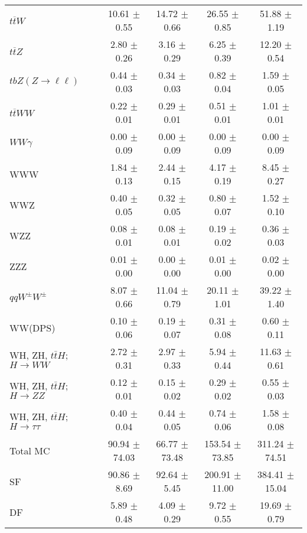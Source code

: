 \begin{tabular}{l|cccc}
                   $t\overline{t}W$ & 10.61 $\pm$  0.55 & 14.72 $\pm$  0.66 & 26.55 $\pm$  0.85 & 51.88 $\pm$  1.19 \\
                   $t\overline{t}Z$ &  2.80 $\pm$  0.26 &  3.16 $\pm$  0.29 &  6.25 $\pm$  0.39 & 12.20 $\pm$  0.54 \\
    $tbZ (Z \rightarrow \ell \ell)$ &  0.44 $\pm$  0.03 &  0.34 $\pm$  0.03 &  0.82 $\pm$  0.04 &  1.59 $\pm$  0.05 \\
                  $t\overline{t}WW$ &  0.22 $\pm$  0.01 &  0.29 $\pm$  0.01 &  0.51 $\pm$  0.01 &  1.01 $\pm$  0.01 \\
                         $WW\gamma$ &  0.00 $\pm$  0.09 &  0.00 $\pm$  0.09 &  0.00 $\pm$  0.09 &  0.00 $\pm$  0.09 \\
                                WWW &  1.84 $\pm$  0.13 &  2.44 $\pm$  0.15 &  4.17 $\pm$  0.19 &  8.45 $\pm$  0.27 \\
                                WWZ &  0.40 $\pm$  0.05 &  0.32 $\pm$  0.05 &  0.80 $\pm$  0.07 &  1.52 $\pm$  0.10 \\
                                WZZ &  0.08 $\pm$  0.01 &  0.08 $\pm$  0.01 &  0.19 $\pm$  0.02 &  0.36 $\pm$  0.03 \\
                                ZZZ &  0.01 $\pm$  0.00 &  0.00 $\pm$  0.00 &  0.01 $\pm$  0.00 &  0.02 $\pm$  0.00 \\
                 $qqW^{\pm}W^{\pm}$ &  8.07 $\pm$  0.66 & 11.04 $\pm$  0.79 & 20.11 $\pm$  1.01 & 39.22 $\pm$  1.40 \\
                            WW(DPS) &  0.10 $\pm$  0.06 &  0.19 $\pm$  0.07 &  0.31 $\pm$  0.08 &  0.60 $\pm$  0.11 \\
WH, ZH, $t\bar{t}H$; $H \rightarrow WW$ &  2.72 $\pm$  0.31 &  2.97 $\pm$  0.33 &  5.94 $\pm$  0.44 & 11.63 $\pm$  0.61 \\
WH, ZH, $t\bar{t}H$; $H \rightarrow ZZ$ &  0.12 $\pm$  0.01 &  0.15 $\pm$  0.02 &  0.29 $\pm$  0.02 &  0.55 $\pm$  0.03 \\
WH, ZH, $t\bar{t}H$; $H \rightarrow \tau\tau$ &  0.40 $\pm$  0.04 &  0.44 $\pm$  0.05 &  0.74 $\pm$  0.06 &  1.58 $\pm$  0.08 \\
\hline\hline
                           Total MC & 90.94 $\pm$ 74.03 & 66.77 $\pm$ 73.48 & 153.54 $\pm$ 73.85 & 311.24 $\pm$ 74.51 \\
\hline
                                 SF & 90.86 $\pm$  8.69 & 92.64 $\pm$  5.45 & 200.91 $\pm$ 11.00 & 384.41 $\pm$ 15.04 \\
                                 DF &  5.89 $\pm$  0.48 &  4.09 $\pm$  0.29 &  9.72 $\pm$  0.55 & 19.69 $\pm$  0.79 \\

\end{tabular}
